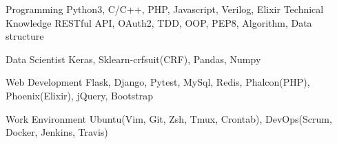 

\begin{cvskills}

  \cvskill
    {Programming} %
    {Python3, C/C++, PHP, Javascript, Verilog, Elixir} %
  \cvskill
    {Technical Knowledge} %
    {RESTful API, OAuth2, TDD, OOP, PEP8, Algorithm, Data structure} %

  \cvskill
    {Data Scientist} %
    {Keras, Sklearn-crfsuit(CRF), Pandas, Numpy} %

  \cvskill
    {Web Development} %
    {Flask, Django, Pytest, MySql, Redis, Phalcon(PHP), Phoenix(Elixir), jQuery, Bootstrap} %

  \cvskill
    {Work Environment} %
    {Ubuntu(Vim, Git, Zsh, Tmux, Crontab), DevOps(Scrum, Docker, Jenkins, Travis)} %

\end{cvskills}
